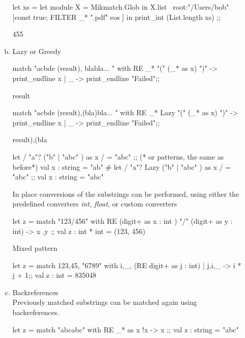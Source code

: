 \begin{enumerate}
\begin{enumerate}[(a)]
\begin{redcode}
let xs =
  let module X = Mikmatch.Glob in
  X.list ~root:"/Users/bob" [const true; FILTER _* ".pdf" eos ]
  in print_int (List.length xs) ;;
\end{redcode}
\begin{bluecode}
455
\end{bluecode}


\item Lazy or Greedy 

  \begin{redcode}
match "acbde (result), blabla... " with 
RE _* "(" (_* as x) ")" -> print_endline x | _ -> print_endline "Failed";;
\end{redcode}
\begin{bluecode}
result
\end{bluecode}

\begin{redcode}
 match "acbde (result),(bla)bla... " with 
 RE _* Lazy "(" (_* as x) ")" -> print_endline x | _ -> print_endline "Failed";;
\end{redcode}
\begin{bluecode}
result),(bla
\end{bluecode}

\begin{alternate}
let / "a"? ("b" | "abc" ) as x / = "abc" ;; (* or patterns, the same as before*)
val x : string = "ab"
# let / "a"? Lazy ("b" | "abc" ) as x / = "abc" ;;
val x : string = "abc"
\end{alternate}

In place conversions of the substrings can be performed, using
either the predefined converters \textit{int, float}, or custom converters

\begin{alternate}
let z  = match "123/456" with RE (digit+ as x : int ) "/" (digit+ as y : int) -> x ,y ;;
val z : int * int = (123, 456)
\end{alternate}

Mixed pattern
\begin{alternate}
let z = match 123,45, "6789" with i,_, (RE digit+ as j : int) | j,i,_ -> i * j + 1;;
val z : int = 835048
\end{alternate}

\item Backreferences \\
  Previously matched substrings can be matched again using backreferences.

  \begin{alternate}
let z =  match "abcabc" with RE _* as x !x -> x ;;
val z : string = "abc"    
\end{alternate}


\end{enumerate}
\end{enumerate}
